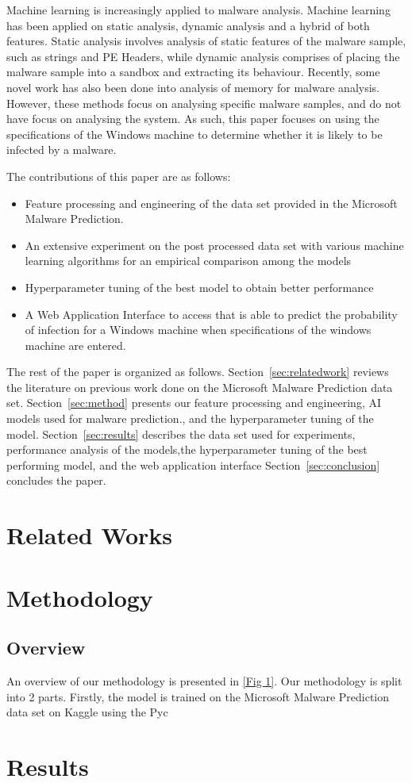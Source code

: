 \documentclass[runningheads]{llncs}
\begin{document}
Machine learning is increasingly applied to malware analysis. Machine learning has been applied on static analysis, dynamic analysis and a hybrid of both features. Static analysis involves analysis of static features of the malware sample, such as strings and PE Headers, while dynamic analysis comprises of placing the malware sample into a sandbox and extracting its behaviour. Recently, some novel work has also been done into analysis of memory for malware analysis. However, these methods focus on analysing specific malware samples, and do not have focus on analysing the system. As such, this paper focuses on using the specifications of the Windows machine to determine whether it is likely to be infected by a malware. \par

The contributions of this paper are as follows:
\begin{itemize}
\item  Feature processing and engineering of the data set provided in the Microsoft Malware Prediction.
\item An extensive experiment on the post processed data set with various machine learning algorithms for an empirical comparison among the models
\item Hyperparameter tuning of the best model to obtain better performance
\item A Web Application Interface to access that is able to predict the probability of infection for a Windows machine when specifications of the windows machine are entered.
\end{itemize}

The rest of the paper is organized as follows. Section~\ref{sec:relatedwork} reviews the literature on previous work done on the Microsoft Malware Prediction data set. Section~\ref{sec:method} presents our feature processing and engineering, AI models used for malware prediction., and the hyperparameter tuning of the model. Section~\ref{sec:results} describes the data set used for experiments, performance analysis of the models,the hyperparameter tuning of the best performing model, and the web application interface Section~\ref{sec:conclusion} concludes the paper. \par

\section{Related Works}
\section{Methodology}
\subsection{Overview}
An overview of our methodology is presented in \ref{Fig 1}. Our methodology is split into 2 parts. Firstly, the model is trained on the Microsoft Malware Prediction data set on Kaggle using the Pyc
\section{Results}
\end{document}
